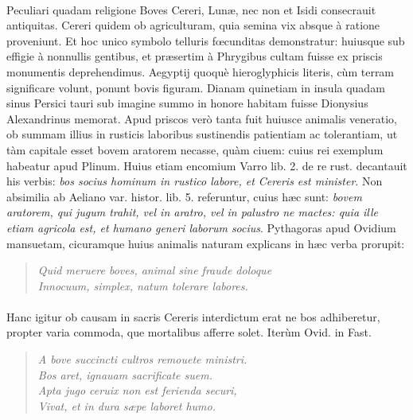 \documentclass[a4paper, 11pt, oneside, polutonikogreek, latin]{article}
\begin{document}
\paragraph{}
Peculiari quadam religione Boves Cereri, Lunæ, nec non et Isidi consecrauit antiquitas. Cereri quidem ob agriculturam, quia semina vix absque à ratione proveniunt. Et hoc unico symbolo telluris fœcunditas demonstratur: huiusque sub effigie à nonnullis gentibus, et præsertim à Phrygibus cultam fuisse ex priscis monumentis deprehendimus. Aegyptij quoquè hieroglyphicis literis, cùm terram significare volunt, ponunt bovis figuram. Dianam quinetiam in insula quadam sinus Persici tauri sub imagine summo in honore habitam fuisse Dionysius Alexandrinus memorat. Apud priscos verò tanta fuit huiusce animalis veneratio, ob summam illius in rusticis laboribus sustinendis patientiam ac tolerantiam, ut tàm capitale esset bovem aratorem necasse, quàm ciuem: cuius rei exemplum habeatur apud Plinum. Huius etiam encomium Varro lib. 2. de re rust. decantauit his verbis: \emph{bos socius hominum in rustico labore, et Cereris est minister}. Non absimilia ab Aeliano var. histor. lib. 5. referuntur, cuius hæc sunt: \emph{bovem aratorem, qui jugum trahit, vel in aratro, vel in palustro ne mactes: quia ille etiam agricola est, et humano generi laborum socius}. Pythagoras apud Ovidium mansuetam, cicuramque huius animalis naturam explicans in hæc verba prorupit:
\begin{quote}
\emph{Quid meruere boves, animal sine fraude doloque}\\
\emph{Innocuum, simplex, natum tolerare labores.}\\
\end{quote}
\paragraph{}
Hanc igitur ob causam in sacris Cereris interdictum erat ne bos adhiberetur, propter varia commoda, que mortalibus afferre solet. Iterùm Ovid. in Fast.
\begin{quote}
\emph{A bove succincti cultros remouete ministri.}\\
\hspace*{10mm}\emph{Bos aret, ignauam sacrificate suem.}\\
\emph{Apta jugo ceruix non est ferienda securi,}\\
\hspace*{10mm}\emph{Vivat, et in dura sæpe laboret humo.}\\
\end{quote}
\end{document}
